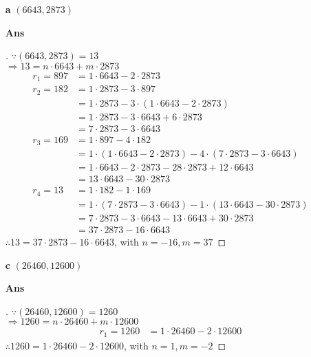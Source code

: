 \documentclass[paper=usletter, fontsize=12pt]{article}
\begin{document}
\begin{itemize}
\begin{itemize}
\begin{itemize}
                \item[\textbf{a}] $(6643, 2873)$
                \item[\textbf{Ans}]
                \begin{proof}[\unskip\nopunct]
                    $\because (6643, 2873) = 13$ \\
                    $\Rightarrow 13 = n \cdot 6643 + m \cdot 2873$
                    \begin{align*}
                        r_1 = 897 & = 1 \cdot 6643 - 2 \cdot 2873 \\
                        r_2 = 182 & = 1 \cdot 2873 - 3 \cdot 897 \\
                        & =  1 \cdot 2873 - 3 \cdot (1 \cdot 6643 - 2 \cdot 2873) \\
                        & =  1 \cdot 2873 - 3 \cdot 6643 + 6 \cdot 2873 \\
                        & =  7 \cdot 2873 - 3 \cdot 6643 \\
                        r_3 = 169 & = 1 \cdot 897 - 4 \cdot 182 \\
                        & = 1 \cdot (1 \cdot 6643 - 2 \cdot 2873) - 4 \cdot (7
                        \cdot 2873 - 3 \cdot 6643) \\
                        & = 1 \cdot 6643 - 2 \cdot 2873 - 28 \cdot 2873 + 12 \cdot 6643 \\
                        & = 13 \cdot 6643 - 30 \cdot 2873 \\
                        r_4 = 13 & = 1 \cdot 182 - 1 \cdot 169 \\
                        & = 1 \cdot (7 \cdot 2873 - 3 \cdot 6643) - 1 \cdot (13 \cdot 6643 - 30 \cdot 2873) \\
                        & = 7 \cdot 2873 - 3 \cdot 6643 - 13 \cdot 6643 + 30 \cdot 2873 \\
                        & = 37 \cdot 2873 - 16 \cdot 6643
                    \end{align*}
                    $\therefore 13 = 37 \cdot 2873 - 16 \cdot 6643$, with $n = -16, m = 37$ \qedhere
                \end{proof}
                \vspace{0.2in}

                \item[\textbf{c}] $(26460, 12600)$
                \item[\textbf{Ans}]
                \begin{proof}[\unskip\nopunct]
                    $\because (26460, 12600) = 1260$ \\
                    $\Rightarrow 1260 = n \cdot 26460 + m \cdot 12600$
                    \begin{align*}
                        r_1 = 1260 & = 1 \cdot 26460 - 2 \cdot 12600
                    \end{align*}
                    $\therefore 1260 = 1 \cdot 26460 - 2 \cdot 12600$, with $n
                    = 1, m = -2$
                \end{proof}
                \vspace{0.2in}


\end{itemize}
\end{itemize}
\end{itemize}
\end{document}
